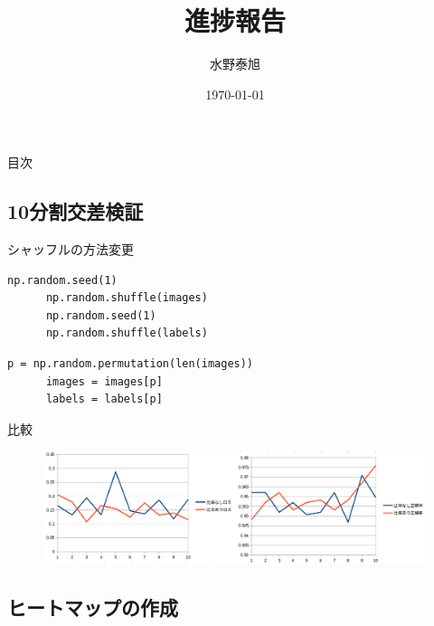 \documentclass[leno,xcolor=dvipsnames]{beamer}
\title{進捗報告}
\date{\today}
\author{水野泰旭}
\institute{弘前大学理工学部電子情報工学科４年}
\begin{document}
  \maketitle

  \begin{frame}{目次}
    \tableofcontents
  \end{frame}

  \begin{frame}
    \section{10分割交差検証}
  \end{frame}

  \begin{frame}[fragile]{シャッフルの方法変更}
    \begin{lstlisting}[caption=シードを用いたシャッフル]
      np.random.seed(1)
      np.random.shuffle(images)
      np.random.seed(1)
      np.random.shuffle(labels)
    \end{lstlisting}

    \begin{lstlisting}[caption=numpy.random.permutationを用いたシャッフル]
      p = np.random.permutation(len(images))
      images = images[p]
      labels = labels[p]
    \end{lstlisting}
  \end{frame}

  \begin{frame}{比較}
    \begin{figure}[H]
      \centering
      \includegraphics[keepaspectratio, scale=0.25]{images/compare_kseparate.png}
    \end{figure}
  \end{frame}

  \begin{frame}
    \section{ヒートマップの作成}
  \end{frame}
\end{document}
